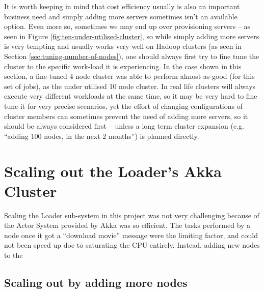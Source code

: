 It is worth keeping in mind that cost efficiency usually is also an important business need and simply adding more servers sometimes isn't an available option. Even more so, sometimes we may end up over provisioning servers -- as seen in Figure \ref{fig:ten-under-utilised-cluster}, so while simply adding more servers is very tempting and usually works very well on Hadoop clusters (as seen in Section \ref{sec:tuning-number-of-nodes}), one should always first try to fine tune the cluster to the specific work-load it is experiencing. In the case shown in this section, a fine-tuned 4 node cluster was able to perform almost as good (for this set of jobs), as the under utilised 10 node cluster. In real life clusters will always execute very different workloads at the same time, so it may be very hard to fine tune it for very precise scenarios, yet the effort of changing configurations of cluster members can sometimes prevent the need of adding more servers, so it should be always considered first -- unless a long term cluster expansion (e.g. ``adding 100 nodes, in the next 2 months'') is planned directly.

%



\section{Scaling out the Loader's Akka Cluster}
\label{sec:scaling-akka}

Scaling the Loader sub-system in this project was not very challenging because of the Actor System provided by Akka was so efficient. The tasks performed by a node once it got a ``download movie'' message were the limiting factor, and could not been speed up doe to saturating the CPU entirely. Instead, adding new nodes to the

\subsection{Scaling out by adding more nodes}
\label{sec:scaling-akka-out}

